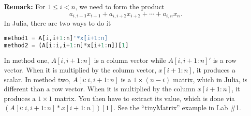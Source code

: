 \textbf{Remark:} For $1 \le i <n$, we need to form the product 
$$ a_{i,i+1}x_{i+1} + a_{i,i+2}x_{i+2} + \cdots + a_{i,n}x_{n}.$$
In Julia, there are two ways to do it
\begin{lstlisting}[language=Julia,style=mystyle]
method1 = A[i,i+1:n]'*x[i+1:n]
method2 = (A[i:i,i+1:n]*x[i+1:n])[1]
\end{lstlisting}
In method one, $A[i,i+1:n]$ is a column vector while $ A[i,i+1:n]'$ is a row vector. When it is multiplied by the column vector, $x[i+1:n]$, it produces a scalar. In method two, $A[i:i,i+1:n]$ is a $1 \times (n-i)$ matrix, which in Julia, is different than a row vector. When it is multiplied by the column  $x[i+1:n]$, it produces a $1 \times 1$ matrix. You then have to extract its value, which is done via $(A[i:i,i+1:n]*x[i+1:n])[1]$. See the ``tinyMatrix'' example in Lab \#1.\\



 
